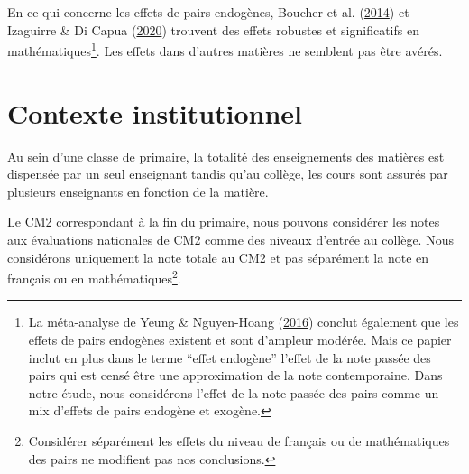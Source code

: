\documentclass[
]{book}
\begin{document}
\quad En ce qui concerne les effets de pairs endogènes, Boucher et al. (\protect\hyperlink{ref-BOU:eal:14}{2014}) et Izaguirre \& Di Capua (\protect\hyperlink{ref-IZA:DIC:20}{2020}) trouvent des effets robustes et significatifs en mathématiques\footnote{La méta-analyse de Yeung \& Nguyen-Hoang (\protect\hyperlink{ref-YEU:NGU:16}{2016}) conclut également que les effets de pairs endogènes existent et sont d'ampleur modérée. Mais ce papier inclut en plus dans le terme ``effet endogène'' l'effet de la note passée des pairs qui est censé être une approximation de la note contemporaine. Dans notre étude, nous considérons l'effet de la note passée des pairs comme un mix d'effets de pairs endogène et exogène.}. Les effets dans d'autres matières ne semblent pas être avérés.

\hypertarget{peinst}{%
\section{Contexte institutionnel}\label{peinst}}

Au sein d'une classe de primaire, la totalité des enseignements des matières est dispensée par un seul enseignant tandis qu'au collège, les cours sont assurés par plusieurs enseignants en fonction de la matière.

\quad Le CM2 correspondant à la fin du primaire, nous pouvons considérer les notes aux évaluations nationales de CM2 comme des niveaux d'entrée au collège. Nous considérons uniquement la note totale au CM2 et pas séparément la note en français ou en mathématiques\footnote{Considérer séparément les effets du niveau de français ou de mathématiques des pairs ne modifient pas nos conclusions.}.
\end{document}
